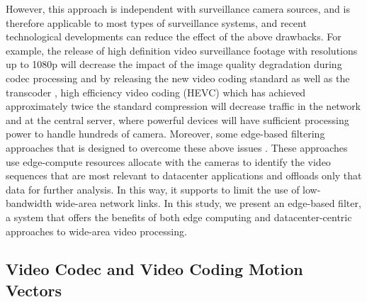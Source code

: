 However, this approach is independent with surveillance camera sources, and is therefore applicable to most types of surveillance systems, and recent technological developments can reduce the effect of the above drawbacks. For example, the release of high definition video surveillance footage with resolutions up to 1080p will decrease the impact of the image quality degradation during codec processing and by releasing the new video coding standard as well as the transcoder \cite{thanh2019efficient}, high efficiency video coding (HEVC)\cite{sullivan2012overview} which has achieved approximately twice the standard compression\cite{ohm2012comparison} will decrease traffic in the network and at the central server, where powerful devices will have sufficient processing power to handle hundreds of camera. Moreover, some edge-based filtering approaches that
is designed to overcome these above issues \cite{canel2019scaling}\cite{li2020reducto}\cite{chen2015glimpse}. These approaches use edge-compute resources allocate with the cameras to identify the video sequences that are most relevant to datacenter applications and offloads only that data for further analysis. In this way, it supports to limit the use of low-bandwidth wide-area network links. In this study, we present an edge-based filter, a system that offers the benefits of both edge computing and datacenter-centric approaches to wide-area video processing.
\subsection{Video Codec and Video Coding Motion Vectors}
